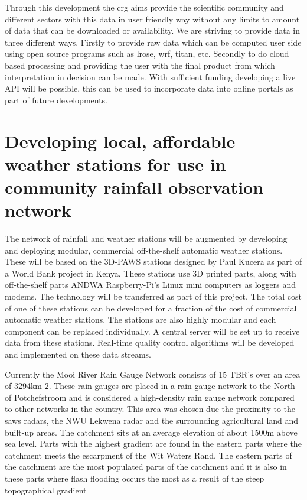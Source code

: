 \documentclass{wrcreport}
\begin{document}
Through this development the \gls{crg} aims provide the scientific
community and different sectors with this data in user friendly way
without any limits to amount of data that can be downloaded or
availability. We are striving to provide data in three different ways.
Firstly to provide raw data which can be computed user side using open
source programs such as \gls{lrose}, \gls{wrf}, titan, etc. Secondly
to do cloud based processing and providing the user with the final
product from which interpretation in decision can be made. With
sufficient funding developing a live API will be possible, this can be
used to incorporate  data into online portals as part of future
developments.

\section{Developing local, affordable weather stations for use in community rainfall observation network}

The network of rainfall and weather stations will be augmented by
developing and deploying modular, commercial off-the-shelf automatic
weather stations. These will be based on the 3D-PAWS stations designed
by Paul Kucera as part of a World Bank project in Kenya. These
stations use 3D printed parts, along with off-the-shelf parts ANDWA
Raspberry-Pi's Linux mini computers as loggers and modems. The
technology will be transferred as part of this project. The total cost
of one of these stations can be developed for a fraction of the cost
of commercial automatic weather stations. The stations are also highly
modular and each component can be replaced individually. A central
server will be set up to receive data from these stations. Real-time
quality control algorithms will be developed and implemented on these
data streams.

Currently the Mooi River Rain Gauge Network consists of 15 TBR’s over
an area of 3294km 2. These rain gauges are placed in a rain gauge
network to the North of Potchefstroom and is considered a high-density
rain gauge network compared to other networks in the country. This
area was chosen due the proximity to the \gls{saws} radars, the NWU
Lekwena radar and the surrounding agricultural land and built-up
areas.  The catchment sits at an average elevation of about 1500m
above sea level. Parts with the highest gradient are found in the
eastern parts where the catchment meets the escarpment of the Wit
Waters Rand. The eastern parts of the catchment are the most populated
parts of the catchment and it is also in these parts where flash
flooding occurs the most as a result of the steep topographical
gradient
\end{document}
